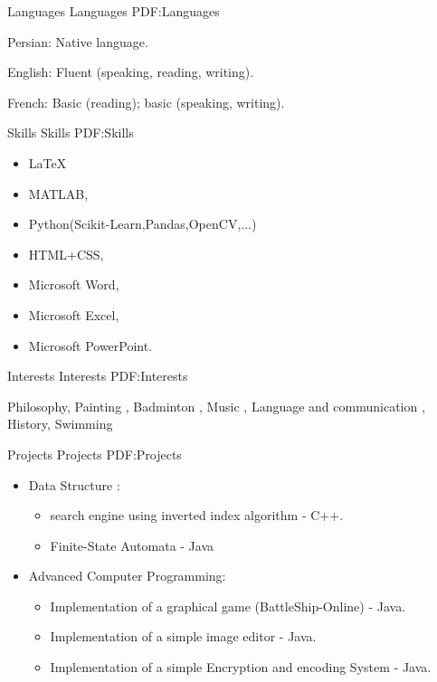 \documentclass[letterpaper,MMMyyyy,nonstopmode]{simpleresumecv}
\begin{document}
\begin{Body}

\Section
{Languages}
{Languages}
{PDF:Languages}

\BulletItem
Persian: Native language.

\Gap
\BulletItem
English: Fluent (speaking, reading, writing).

\Gap
\BulletItem
French: Basic (reading); basic (speaking, writing).


\Section
{Skills}
{Skills}
{PDF:Skills}

\Entry

\begin{itemize}
\item{\LaTeX}
\item MATLAB,
\item Python(Scikit-Learn,Pandas,OpenCV,...)
\item HTML+CSS,
\item Microsoft Word,
\item Microsoft Excel,
\item Microsoft PowerPoint.

\end{itemize}


\Section
{Interests}
{Interests}
{PDF:Interests}

\Entry
Philosophy,
Painting ,
Badminton ,
Music ,  
Language  and communication ,
History,
Swimming

\newpage 


\Section
{Projects}
{Projects}
{PDF:Projects}

\Entry
\begin{itemize}
	\item Data Structure :
		\begin{itemize}
		\item	search engine using inverted index algorithm - C++.
	     \item   Finite-State Automata - Java
		\end{itemize}
		
	\item Advanced Computer Programming:
		\begin{itemize}[$\circ$]
		\item  Implementation of a graphical game (BattleShip-Online) - Java.
     	\item Implementation of a simple image editor - Java.
	    \item Implementation of a simple Encryption and encoding System  - Java.
		\end{itemize}
		

\end{itemize}
\end{Body}
\end{document}

